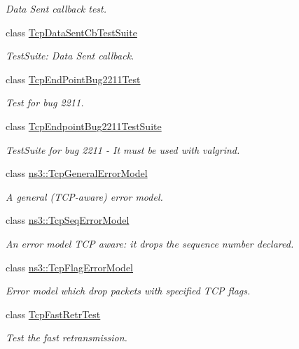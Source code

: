 \begin{DoxyCompactItemize}
\begin{DoxyCompactList}\small\item\em Data Sent callback test. \end{DoxyCompactList}\item 
class \hyperlink{classTcpDataSentCbTestSuite}{Tcp\+Data\+Sent\+Cb\+Test\+Suite}
\begin{DoxyCompactList}\small\item\em Test\+Suite\+: Data Sent callback. \end{DoxyCompactList}\item 
class \hyperlink{classTcpEndPointBug2211Test}{Tcp\+End\+Point\+Bug2211\+Test}
\begin{DoxyCompactList}\small\item\em Test for bug 2211. \end{DoxyCompactList}\item 
class \hyperlink{classTcpEndpointBug2211TestSuite}{Tcp\+Endpoint\+Bug2211\+Test\+Suite}
\begin{DoxyCompactList}\small\item\em Test\+Suite for bug 2211 -\/ It must be used with valgrind. \end{DoxyCompactList}\item 
class \hyperlink{classns3_1_1TcpGeneralErrorModel}{ns3\+::\+Tcp\+General\+Error\+Model}
\begin{DoxyCompactList}\small\item\em A general (T\+C\+P-\/aware) error model. \end{DoxyCompactList}\item 
class \hyperlink{classns3_1_1TcpSeqErrorModel}{ns3\+::\+Tcp\+Seq\+Error\+Model}
\begin{DoxyCompactList}\small\item\em An error model T\+CP aware\+: it drops the sequence number declared. \end{DoxyCompactList}\item 
class \hyperlink{classns3_1_1TcpFlagErrorModel}{ns3\+::\+Tcp\+Flag\+Error\+Model}
\begin{DoxyCompactList}\small\item\em Error model which drop packets with specified T\+CP flags. \end{DoxyCompactList}\item 
class \hyperlink{classTcpFastRetrTest}{Tcp\+Fast\+Retr\+Test}
\begin{DoxyCompactList}\small\item\em Test the fast retransmission. \end{DoxyCompactList}\item 

\end{DoxyCompactItemize}
